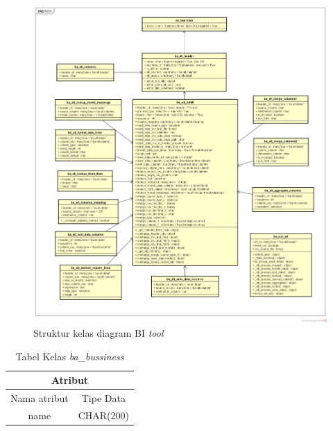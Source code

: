\begin{figure}[h]
	\centering
	\includegraphics[scale=0.4]{Gambar/Class-Diagram-bi-tool}
	\caption{Struktur kelas diagram BI \textit{tool}}
	\end{figure}
	
	
	\begin{table}[H]
	\centering
		\caption{Tabel Kelas \textit{ba\_bussiness}}
		\begin{tabular}{ | c | c|}
			\hline
				\multicolumn{2}{|c|}{Atribut}\\ \hline 
				Nama atribut & Tipe Data\\ \hline
			name & CHAR(200)\\ \hline
		\end{tabular}
\end{table}

